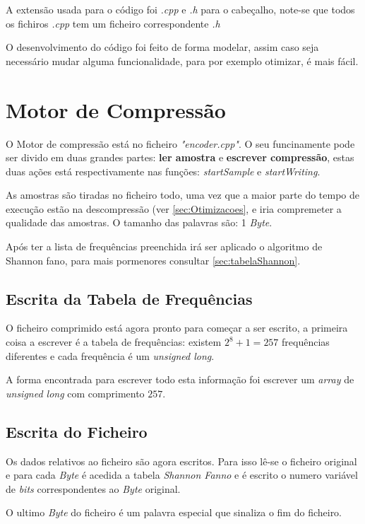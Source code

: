 \documentclass[11pt,a4paper]{report}
\begin{document}
A extensão usada para o código foi \textit{.cpp} e \textit{.h} para o cabeçalho, note-se que todos os fichiros \textit{.cpp} tem um ficheiro correspondente \textit{.h}

O desenvolvimento do código foi feito de forma modelar, assim caso seja necessário  mudar alguma funcionalidade, para por exemplo otimizar, é mais fácil.

\newpage
\section{Motor de Compressão} 
O Motor de compressão está no ficheiro \textit{"encoder.cpp"}. O seu funcinamente pode ser divido em duas grandes partes: \textbf{ler amostra} e \textbf{escrever compressão}, estas duas ações está respectivamente nas funções: \textit{startSample} e \textit{startWriting}. 

As amostras são tiradas no ficheiro todo, uma vez que a maior parte do tempo de execução estão na descompressão (ver \ref{sec:Otimizacoes}, e iria compremeter a qualidade das amostras.
O tamanho das palavras são: 1 \textit{Byte}.

Após ter a lista de frequências preenchida irá ser aplicado o algoritmo de Shannon fano, para mais pormenores consultar \ref{sec:tabelaShannon}.
 
\subsection{Escrita da Tabela de Frequências}
O ficheiro comprimido está agora pronto para começar a ser escrito, a primeira coisa a escrever é a tabela de frequências: existem $2^8 + 1 = 257$ frequências diferentes e cada frequência é um \textit{unsigned long}.

A forma encontrada para escrever todo esta informação foi escrever um \textit{array} de \textit{unsigned long} com comprimento $257$.

\subsection{Escrita do Ficheiro}
Os dados relativos ao ficheiro são agora escritos. Para isso lê-se o ficheiro original e para cada  \textit{Byte} é acedida a tabela \textit{Shannon Fanno} e é escrito o numero variável de \textit{bits} correspondentes ao \textit{Byte} original.

O ultimo \textit{Byte} do ficheiro é um palavra especial que sinaliza o fim do ficheiro. 
\end{document}
